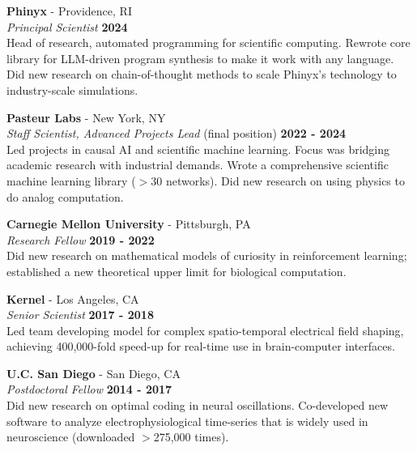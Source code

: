 \documentclass[margin,line]{res}
\begin{document}
\begin{resume}
\vspace{-.25cm}
{\bf Phinyx} - Providence, RI\\
{\em Principal Scientist} \hfill {\bf 2024}\\
Head of research, automated programming for scientific computing. Rewrote core library for LLM-driven program synthesis to make it work with any language. Did new research on chain-of-thought methods to scale Phinyx's technology to industry-scale simulations.

\vspace{-.25cm}
{\bf Pasteur Labs} - New York, NY\\
{\em Staff Scientist, Advanced Projects Lead} (final position) \hfill {\bf 2022 - 2024}\\
Led projects in causal AI and scientific machine learning. Focus was bridging academic research with industrial demands. Wrote a comprehensive scientific machine learning library ($>$30 networks). Did new research on using physics to do analog computation.


\vspace{-.25cm}
{\bf Carnegie Mellon University} - Pittsburgh, PA\\
{\em Research Fellow} \hfill {\bf 2019 - 2022}\\
Did new research on mathematical models of curiosity in reinforcement learning; established a new theoretical upper limit for biological computation.

\vspace{-.25cm}
{\bf Kernel} - Los Angeles, CA\\
{\em Senior Scientist} \hfill {\bf 2017 - 2018}\\
Led team developing model for complex spatio-temporal electrical field shaping, achieving 400,000-fold speed-up for real-time use in brain-computer interfaces.

\vspace{-.25cm}
{\bf U.C. San Diego} - San Diego, CA\\
{\em Postdoctoral Fellow} \hfill {\bf 2014 - 2017}\\
Did new research on optimal coding in neural oscillations. Co-developed new software to analyze electrophysiological time-series that is widely used in neuroscience (downloaded $>$275,000 times).



\end{resume}
\end{document}

